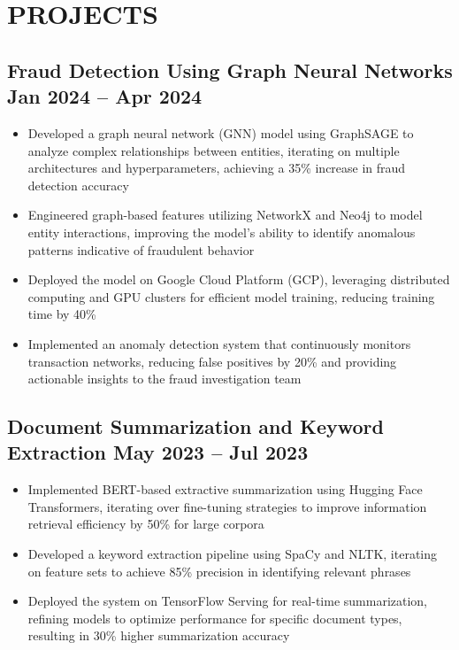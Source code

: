 \documentclass[12pt,a4paper]{article}
\begin{document}
\section*{PROJECTS}
\subsection*{Fraud Detection Using Graph Neural Networks \textnormal{\hfill Jan 2024 – Apr 2024}}
\begin{itemize}[leftmargin=*,noitemsep,topsep=0pt]
\item Developed a graph neural network (GNN) model using GraphSAGE to analyze complex relationships between entities, iterating on multiple architectures and hyperparameters, achieving a 35\% increase in fraud detection accuracy
\item Engineered graph-based features utilizing NetworkX and Neo4j to model entity interactions, improving the model’s ability to identify anomalous patterns indicative of fraudulent behavior
\item Deployed the model on Google Cloud Platform (GCP), leveraging distributed computing and GPU clusters for efficient model training, reducing training time by 40\%
\item Implemented an anomaly detection system that continuously monitors transaction networks, reducing false positives by 20\% and providing actionable insights to the fraud investigation team
\end{itemize}

\subsection*{Document Summarization and Keyword Extraction \textnormal{\hfill May 2023 – Jul 2023}}
\begin{itemize}[leftmargin=*,noitemsep,topsep=0pt]
\item Implemented BERT-based extractive summarization using Hugging Face Transformers, iterating over fine-tuning strategies to improve information retrieval efficiency by 50\% for large corpora
\item Developed a keyword extraction pipeline using SpaCy and NLTK, iterating on feature sets to achieve 85\% precision in identifying relevant phrases
\item Deployed the system on TensorFlow Serving for real-time summarization, refining models to optimize performance for specific document types, resulting in 30\% higher summarization accuracy
\end{itemize}
\end{document}
